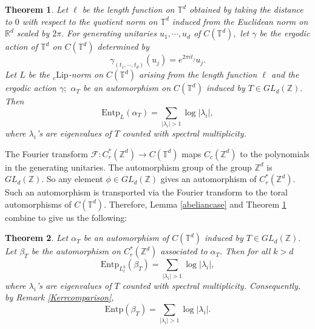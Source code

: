\documentclass[a4paper,11pt,reqno]{amsart}
\theoremstyle{plain}
\newtheorem{thm}{Theorem}[section]
\theoremstyle{mainthmstyle}
\theoremstyle{named}
\numberwithin{equation}{section}
\begin{document}
\begin{thm}\label{commtorus}
     Let $\ell$ be the length function on $\mathbb T^{d}$ obtained by taking the distance to $0$ with respect to the quotient norm on $\mathbb T^{d}$ induced from the Euclidean norm on $\mathbb R^{d}$ scaled by $2 \pi.$ For generating unitaries $u_1, \cdots, u_d$ of $C(\mathbb T^{d}),$ let $\gamma$ be the ergodic action of $\mathbb T^{d}$ on $C(\mathbb T^{d})$ determined by 
     $$\gamma_{\left (t_1, \cdots, t_d \right )} \left (u_j \right ) = e^{2 \pi i t_j} u_j.$$ Let $L$ be the ${}_c\mathrm{Lip}$-norm on $C(\mathbb T^{d})$ arising from the length function $\ell$ and the ergodic action $\gamma;$ $\alpha_{T}$ be an automorphism on $C \left (\mathbb T^{d} \right )$ induced by $T \in GL_{d} (\mathbb Z).$ Then $$\mathrm {Entp}_{L} \left (\alpha_{T} \right ) = \sum\limits_{\left \lvert \lambda_i \right \rvert > 1} \log \left \lvert \lambda_i \right \rvert,$$ where $\lambda_i$'s are eigenvalues of $T$ counted with spectral multiplicity.  
\end{thm}
The Fourier transform 
$\mathcal{F}:C^{\ast}_{r}(\mathbb{Z}^d)\rightarrow C(\mathbb{T}^d)$ maps $C_{c}(\mathbb{Z}^{d})$ to the polynomials in the generating unitaries. The automorphism group of the group $\mathbb{Z}^{d}$ is $GL_{d}(\mathbb{Z})$. So any element $\phi\in GL_{d}(\mathbb{Z})$ gives an automorphism of $C^{\ast}_{r}(\mathbb{Z}^d)$. Such an automorphism is transported via the Fourier transform to the toral automorphisms of $C(\mathbb{T}^d)$. Therefore, Lemma \ref{abeliancase} and Theorem \ref{commtorus} combine to give us the following:
\begin{thm} \label{entpZ}
 Let $\alpha_{T}$ be an automorphism of $C \left (\mathbb T^{d} \right )$ induced by $T \in GL_{d} \left (\mathbb Z \right ).$ Let $\beta_{T}$ be the automorphism on $C_{r}^{\ast} \left (\mathbb Z^{d} \right )$ associated to $\alpha_{T}.$ Then for all $k > d$ $$\mathrm {Entp}_{L_{\ell}^{k}} \left (\beta_{T} \right ) = \sum\limits_{\left \lvert \lambda_i \right \rvert > 1} \log \left \lvert \lambda_i \right \rvert,$$ where $\lambda_i$'s are eigenvalues of $T$ counted with spectral multiplicity. Consequently, by Remark \ref{Kerrcomparison}, \begin{displaymath}\mathrm{Entp}\left (\beta_{T} \right ) = \sum\limits_{\left \lvert \lambda_i \right \rvert > 1} \log \left \lvert \lambda_i \right \rvert.\end{displaymath}
\end{thm}
\end{document}
